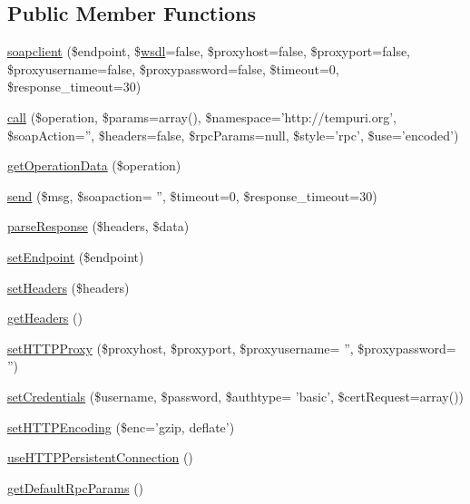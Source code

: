 \subsection*{Public Member Functions}
\begin{DoxyCompactItemize}
\item 
\hyperlink{classsoapclient_a59db1a21560241cf6aa51c813cd22e29}{soapclient} (\$endpoint, \$\hyperlink{classwsdl}{wsdl}=false, \$proxyhost=false, \$proxyport=false, \$proxyusername=false, \$proxypassword=false, \$timeout=0, \$response\-\_\-timeout=30)
\item 
\hyperlink{classsoapclient_a806d1d83f45454caf9c6c361c0a4b0ad}{call} (\$operation, \$params=array(), \$namespace='http\-://tempuri.\-org', \$soap\-Action='', \$headers=false, \$rpc\-Params=null, \$style='rpc', \$use='encoded')
\item 
\hyperlink{classsoapclient_ad66fb2de1dae9b9597bed83de4f343a7}{get\-Operation\-Data} (\$operation)
\item 
\hyperlink{classsoapclient_aece60a5a6bd359481071516aa7024b56}{send} (\$msg, \$soapaction= '', \$timeout=0, \$response\-\_\-timeout=30)
\item 
\hyperlink{classsoapclient_aca1ed2155629bfc242ddea3636ac24c1}{parse\-Response} (\$headers, \$data)
\item 
\hyperlink{classsoapclient_abab265adeddb116a65a24dc0fa1eafb2}{set\-Endpoint} (\$endpoint)
\item 
\hyperlink{classsoapclient_ac1f59fefc1b33175a734321e13b42253}{set\-Headers} (\$headers)
\item 
\hyperlink{classsoapclient_a157e0005d82edaa21cbea07fdc5c62da}{get\-Headers} ()
\item 
\hyperlink{classsoapclient_a52152e7ae9c46863424bbafacf6a7f71}{set\-H\-T\-T\-P\-Proxy} (\$proxyhost, \$proxyport, \$proxyusername= '', \$proxypassword= '')
\item 
\hyperlink{classsoapclient_ada213133d177c1c9c07435d65e89e735}{set\-Credentials} (\$username, \$password, \$authtype= 'basic', \$cert\-Request=array())
\item 
\hyperlink{classsoapclient_a9528927202777242800c394fadc03191}{set\-H\-T\-T\-P\-Encoding} (\$enc='gzip, deflate')
\item 
\hyperlink{classsoapclient_a6558d144faf99ccc9ef4621ffd56bd75}{use\-H\-T\-T\-P\-Persistent\-Connection} ()
\item 
\hyperlink{classsoapclient_a95ae30619429aa7d1c93f21e33300419}{get\-Default\-Rpc\-Params} ()
\item 

\end{DoxyCompactItemize}

